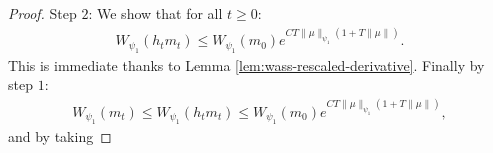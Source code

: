 \documentclass[11pt,a4paper]{article}
\newcommand{\RRP}{\mathbb{R}^+_*}
\newcommand{\brac}[1]{\left\langle#1\right\rangle}
\newcommand{\dd}{\mathop{}\!\mathrm{d}}
\begin{document}
\begin{proof}
    Step $2$: We show that for all $t \geq 0$:
    \begin{align*}
        W_{\psi_1}\left(h_tm_t\right) \leq W_{\psi_1}\left(m_0\right) e^{CT\|\mu\|_{\psi_1}\left(1 + T\|\mu\|\right)}.
    \end{align*}
    This is immediate thanks to Lemma \ref{lem:wass-rescaled-derivative}. Finally by step $1$:
    \begin{align*}
        W_{\psi_1}(m_t) \leq W_{\psi_1}(h_t m_t) \leq W_{\psi_1}\left(m_0\right) e^{CT\|\mu\|_{\psi_1}\left(1 + T\|\mu\|\right)},
    \end{align*}
    and by taking 

\end{proof}
\end{document}
